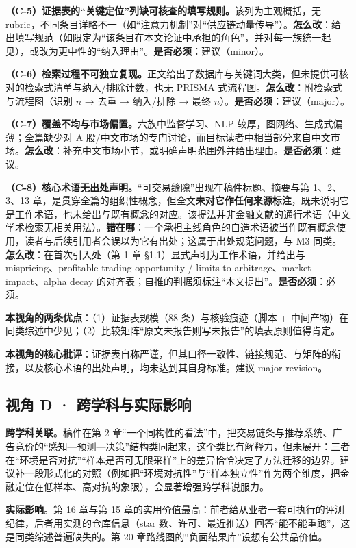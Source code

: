 \documentclass[11pt,a4paper]{ctexart}
\begin{document}
\textbf{（C-5）证据表的“关键定位”列缺可核查的填写规则。}该列为主观概括，无 rubric，不同条目详略不一（如“注意力机制”对“供应链动量传导”）。\textbf{怎么改}：给出填写规范（如限定为“该条目在本文论证中承担的角色”，并对每一族统一起见），或改为更中性的“纳入理由”。\textbf{是否必须}：建议（minor）。

\textbf{（C-6）检索过程不可独立复现。}正文给出了数据库与关键词大类，但未提供可核对的检索式清单与纳入/排除计数，也无 PRISMA 式流程图。\textbf{怎么改}：附检索式与流程图（识别 $n$ → 去重 → 纳入/排除 → 最终 $n$）。\textbf{是否必须}：建议（major）。

\textbf{（C-7）覆盖不均与市场偏置。}六族中监督学习、NLP 较厚，图网络、生成式偏薄；全篇缺少对 A 股/中文市场的专门讨论，而目标读者中相当部分来自中文市场。\textbf{怎么改}：补充中文市场小节，或明确声明范围外并给出理由。\textbf{是否必须}：建议。

\textbf{（C-8）核心术语无出处声明。}“可交易缝隙”出现在稿件标题、摘要与第 1、2、3、13 章，是贯穿全篇的组织性概念，但全文\textbf{未对它作任何来源标注}，既未说明它是工作术语，也未给出与既有概念的对应。该提法并非金融文献的通行术语（中文学术检索无相关用法）。\textbf{错在哪}：一个承担主线角色的自造术语被当作既有概念使用，读者与后续引用者会误以为它有出处；这属于出处规范问题，与 M3 同类。\textbf{怎么改}：在首次引入处（第 1 章 §1.1）显式声明为工作术语，并给出与 mispricing、profitable trading opportunity / limits to arbitrage、market impact、alpha decay 的对齐表；自推的判据须标注“本文提出”。\textbf{是否必须}：必须。

\textbf{本视角的两条优点}：（1）证据表规模（88 条）与核验痕迹（脚本 + 中间产物）在同类综述中少见；（2）比较矩阵“原文未报告则写未报告”的填表原则值得肯定。

\textbf{本视角的核心批评}：证据表自称严谨，但其口径一致性、链接规范、与矩阵的衔接，以及核心术语的出处声明，均未达到其自身标准。建议 major revision。

\subsection{视角 D · 跨学科与实际影响}

\textbf{跨学科关联}。稿件在第 2 章“一个同构性的看法”中，把交易链条与推荐系统、广告竞价的“感知—预测—决策”结构类同起来，这个类比有解释力，但未展开：三者在“环境是否对抗”“样本是否可无限采样”上的差异恰恰决定了方法迁移的边界。建议补一段形式化的对照（例如把“环境对抗性”与“样本独立性”作为两个维度，把金融定位在低样本、高对抗的象限），会显著增强跨学科说服力。

\textbf{实际影响}。第 16 章与第 15 章的实用价值最高：前者给从业者一套可执行的评测纪律，后者用实测的仓库信息（star 数、许可、最近推送）回答“能不能重跑”，这是同类综述普遍缺失的。第 20 章路线图的“负面结果库”设想有公共品价值。
\end{document}
